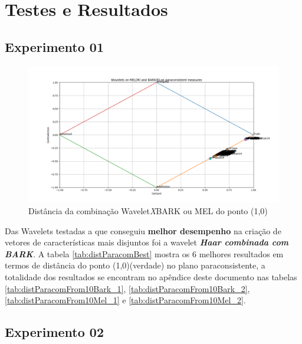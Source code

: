 \chapter{Testes e Resultados} \label{chap:testsResults}
	\begin{myenv}{1.5}
		\section{Experimento 01}
		\begin{figure}[h]
			\centering
			\includegraphics[width=0.7\linewidth]{images/results/paraconsistentPlane/Figure_1}
			\caption{Distância da combinação Wavelet\textit{X}BARK ou MEL do ponto (1,0)}
			\label{fig:figure1}
		\end{figure}

		
		\par Das Wavelets testadas a que conseguiu \textbf{melhor desempenho} na criação de vetores de características mais disjuntos foi a wavelet \textit{\textbf{Haar combinada com BARK}}. A tabela \ref{tab:distParacomBest} mostra os 6 melhores resultados em termos de distância do ponto (1,0)(verdade) no plano paraconsistente, a totalidade dos resultados se encontram no apêndice deste documento nas tabelas \ref{tab:distParacomFrom10Bark_1}, \ref{tab:distParacomFrom10Bark_2}, \ref{tab:distParacomFrom10Mel_1} e \ref{tab:distParacomFrom10Mel_2}.
		
		\section{Experimento 02}
		

\end{myenv}
